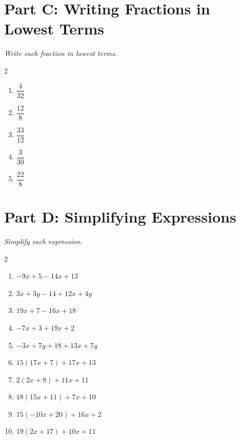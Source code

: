 \documentclass[11pt]{article}
\begin{document}
\section*{Part C: Writing Fractions in Lowest Terms}
\noindent\textit{Write each fraction in lowest terms.}
\begin{multicols}{2}
\begin{enumerate}
  \item $\dfrac{4}{32}$
  \vspace{1.1cm}
  \item $\dfrac{12}{8}$
  \vspace{1.1cm}
  \item $\dfrac{33}{12}$
  \vspace{1.1cm}
  \item $\dfrac{3}{30}$
  \vspace{1.1cm}
  \item $\dfrac{22}{8}$
  \vspace{1.1cm}
\end{enumerate}
\end{multicols}

\section*{Part D: Simplifying Expressions}
\noindent\textit{Simplify each expression.}
\begin{multicols}{2}
\begin{enumerate}
  \item $-9x + 5 - 14x + 13$
  \vspace{1.3cm}
  \item $3x + 3y - 14 + 12x + 4y$
  \vspace{1.3cm}
  \item $19x + 7 - 16x + 18$
  \vspace{1.3cm}
  \item $-7x + 3 + 19x + 2$
  \vspace{1.3cm}
  \item $-3x + 7y + 18 + 13x + 7y$
  \vspace{1.3cm}
  \item $15(17x + 7) + 17x + 13$
  \vspace{1.3cm}
  \item $2(2x + 8) + 11x + 11$
  \vspace{1.3cm}
  \item $18(15x + 11) + 7x + 10$
  \vspace{1.3cm}
  \item $15(-10x + 20) + 16x + 2$
  \vspace{1.3cm}
  \item $19(2x + 17) + 10x + 11$
  \vspace{1.3cm}
\end{enumerate}
\end{multicols}
\end{document}
